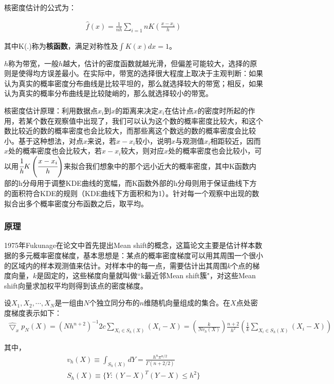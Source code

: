 \documentclass[12pt]{article}
\begin{document}
核密度估计的公式为：

\begin{align}
\hat{f}(x) = \frac{1}{nh}\sum_{i=1}{n}K(\frac{x-x_i}{h})
\end{align}

其中K(.)称为\textbf{核函数}，满足对称性及$\int K(x)dx=1$。

$h$称为带宽，一般$h$越大，估计的密度函数就越光滑，但偏差可能较大，选择的原则是使得均方误差最小。在实际中，带宽的选择很大程度上取决于主观判断：如果认为真实的概率密度分布曲线是比较平坦的，那么就选择较大的带宽；相反，如果认为真实的概率分布曲线是比较陡峭的，那么就选择较小的带宽。

核密度估计原理：利用数据点$x_i$到$x$的距离来决定$x_i$在估计点$x$的密度时所起的作用，若某个数在观察值中出现了，我们可以认为这个数的概率密度比较大，和这个数比较近的数的概率密度也会比较大，而那些离这个数远的数的概率密度会比较小。基于这种想法，对点$x$来说，若$x-x_i$较小，说明$x$与观测值$x_i$相距较近，因而$x$处的概率密度也会比较大，若$x-x_i$较大，则对应$x$处的概率密度也会比较小，可以用$\cfrac{1}{h}K\left(\cfrac{x-x_i}{h}\right)$来拟合我们想象中的那个远小近大的概率密度，其中K函数内部的h分母用于调整KDE曲线的宽幅，而K函数外部的h分母则用于保证曲线下方的面积符合KDE的规则（KDE曲线下方面积和为1）。针对每一个观察中出现的数拟合出多个概率密度分布函数之后，取平均。

\subsubsection{原理}

1975年Fukunage在论文\cite{fukunaga1975estimation}中首先提出Mean shift的概念，这篇论文主要是估计样本数据的多元概率密度梯度，基本思想是：某点的概率密度梯度可以用其周围一个很小的区域内的样本观测值来估计。对样本中的每一点，需要估计出其周围$k$个点的梯度向量，$k$是固定的，这些梯度向量就叫做“k最近邻Mean shift簇"，对这些Mean shift向量求加权平均则得到该点的密度梯度。

设$X_1, X_2, \cdots, X_N$是一组由$N$个独立同分布的$n$维随机向量组成的集合。在$X$点处密度梯度表示如下：
\begin{align}
\label{align: DensityGradient}
\hat{\bigtriangledown}_x p_N(X) = (Nh^{n+2})^{-1}2c \sum_{X_i \in S_h(X)} (X_i - X) = \left(\frac{k}{Nv_h(X)}\right) \frac{n+2}{h^2} \left(\frac{1}{k} \sum_{X_i \in S_h(X)} (X_i - X)\right)
\end{align}

其中，
\begin{align}
v_h(X) \equiv \int_{S_h(X)}dY = \frac{h^n\pi^{n/2}}{\Gamma(n+2/2)}\\
S_h(X) \equiv \{Y:(Y-X)^T(Y-X) \le h^2\}
\end{align}
\end{document}
